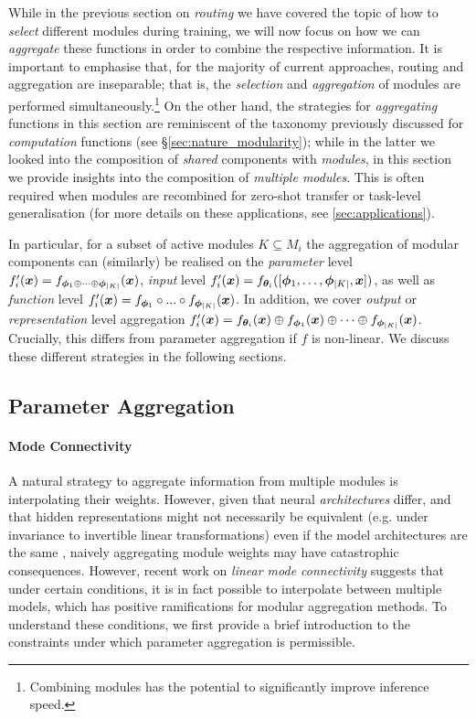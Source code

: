\documentclass[10pt]{article} %
\begin{document}
While in the previous section on \textit{routing} we have covered the topic of how to \textit{select} different modules during training, we will now focus on how we can \textit{aggregate} these functions in order to combine the respective information. It is important to emphasise that, for the majority of current approaches, routing and aggregation are inseparable; that is, the \textit{selection} and \textit{aggregation} of modules are performed simultaneously.\footnote{Combining modules has the potential to significantly improve inference speed.} 
On the other hand, the strategies for \textit{aggregating} functions in this section are reminiscent of the taxonomy previously discussed for \textit{computation} functions (see \S\ref{sec:nature_modularity}); while in the latter we looked  into the composition of \textit{shared} components with \textit{modules}, in this section we provide insights into the composition of \textit{multiple modules}. This is often required when modules are recombined for zero-shot transfer or task-level generalisation (for more details on these applications, see \cref{sec:applications}).
 
In particular, for a subset of active modules $K \subseteq M_i$ the aggregation of modular components can (similarly) be realised on the \textit{parameter} level  
$f_i^\prime({\bm{x}}) = f_{{\bm{\phi}}_{1} \oplus \dots \oplus {\bm{\phi}}_{|K|}}({\bm{x}})$, \textit{input} level $f_i^\prime({\bm{x}}) = f_{{\bm{\theta}}_i}([{\bm{\phi}}_1, \dots, {\bm{\phi}}_{|K|}, {\bm{x}}])$, as well as \textit{function} level $f_i^\prime({\bm{x}}) = f_{{\bm{\phi}}_{1}} \circ ... \circ f_{{\bm{\phi}}_{|K|}}({\bm{x}})$. In addition, we cover \textit{output} or \textit{representation} level aggregation $f_i^\prime({\bm{x}}) = f_{{\bm{\theta}}_i}({\bm{x}}) \oplus f_{{\bm{\phi}}_1}({\bm{x}}) \oplus \dots \oplus f_{{\bm{\phi}}_{|K|}}({\bm{x}})$. Crucially, this differs from parameter aggregation if $f$ is non-linear.
We discuss these different strategies in the following sections. 

\subsection{Parameter Aggregation}
\label{sec:compositionality:det}

\paragraph*{Mode Connectivity}
A natural strategy to aggregate information from multiple modules is interpolating their weights. However, given that neural \textit{architectures} differ, and that hidden representations might not necessarily be equivalent (e.g. under invariance to invertible linear transformations) even if the model architectures are the same \citep{Kornblith2019SimilairtyofNN}, naively aggregating module weights may have catastrophic consequences. However, recent work on \textit{linear mode connectivity} \citep{Frankle2020LinearModeConnect} suggests that under certain conditions, it is in fact possible to interpolate between multiple models, which has positive ramifications for modular aggregation methods. To understand these conditions, we first provide a brief introduction to the constraints under which parameter aggregation is permissible.
\end{document}
